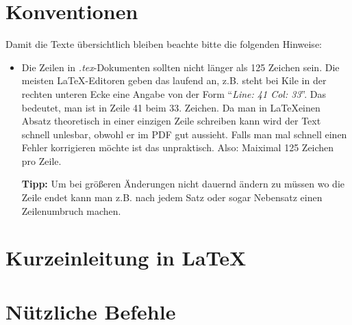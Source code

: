 \documentclass[a4paper,10pt]{article}
\begin{document}
\section{Konventionen}

Damit die Texte übersichtlich bleiben beachte bitte die folgenden Hinweise:
\begin{itemize}
   \item Die Zeilen in \textit{.tex}-Dokumenten sollten nicht länger als 125 Zeichen sein. Die meisten \LaTeX-Editoren
         geben das laufend an, z.B. steht bei Kile in der rechten unteren Ecke eine Angabe von der Form
         ``\textit{Line: 41 Col: 33}''. Das bedeutet, man ist in Zeile 41 beim 33. Zeichen. Da man in \LaTeX einen
         Absatz theoretisch in einer einzigen Zeile schreiben kann wird der Text schnell unlesbar, obwohl er im PDF
         gut aussieht. Falls man mal schnell einen Fehler korrigieren möchte ist das unpraktisch.
         Also: Maiximal 125 Zeichen pro Zeile.
         
         \textbf{Tipp:} Um bei größeren Änderungen nicht dauernd ändern zu müssen wo die Zeile endet kann man
         z.B. nach jedem Satz oder sogar Nebensatz einen Zeilenumbruch machen.
\end{itemize}

\section{Kurzeinleitung in \LaTeX}

\section{Nützliche Befehle}
\end{document}
